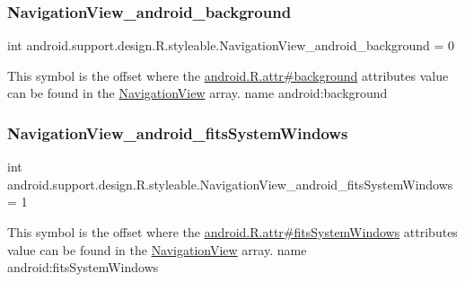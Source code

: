 \subsubsection{\texorpdfstring{Navigation\+View\+\_\+android\+\_\+background}{NavigationView\_android\_background}}
{\footnotesize\ttfamily int android.\+support.\+design.\+R.\+styleable.\+Navigation\+View\+\_\+android\+\_\+background = 0\hspace{0.3cm}{\ttfamily [static]}}

This symbol is the offset where the \hyperlink{}{android.\+R.\+attr\#background} attribute\textquotesingle{}s value can be found in the \hyperlink{classandroid_1_1support_1_1design_1_1R_1_1styleable_a277c199f371e8804c26e2cd6dbf88999}{Navigation\+View} array.  name android\+:background \mbox{\label{classandroid_1_1support_1_1design_1_1R_1_1styleable_a7d4c3e8d72fd2345f359507c8482446e}} 
\subsubsection{\texorpdfstring{Navigation\+View\+\_\+android\+\_\+fits\+System\+Windows}{NavigationView\_android\_fitsSystemWindows}}
{\footnotesize\ttfamily int android.\+support.\+design.\+R.\+styleable.\+Navigation\+View\+\_\+android\+\_\+fits\+System\+Windows = 1\hspace{0.3cm}{\ttfamily [static]}}

This symbol is the offset where the \hyperlink{}{android.\+R.\+attr\#fits\+System\+Windows} attribute\textquotesingle{}s value can be found in the \hyperlink{classandroid_1_1support_1_1design_1_1R_1_1styleable_a277c199f371e8804c26e2cd6dbf88999}{Navigation\+View} array.  name android\+:fits\+System\+Windows \mbox{\label{classandroid_1_1support_1_1design_1_1R_1_1styleable_a9bc98cd7d61a1ee939f9db53d2db45e4}} 
